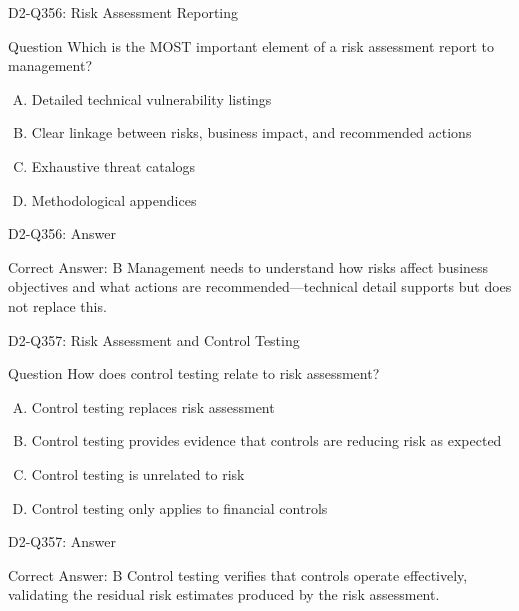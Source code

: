 \documentclass{beamer}
\begin{document}
\begin{frame}{D2-Q356: Risk Assessment Reporting}
	\begin{block}{Question}
		Which is the MOST important element of a risk assessment report to management?
	\end{block}
	\begin{enumerate}[(A)]
		\item Detailed technical vulnerability listings
		\item Clear linkage between risks, business impact, and recommended actions
		\item Exhaustive threat catalogs
		\item Methodological appendices
	\end{enumerate}
\end{frame}
\begin{frame}{D2-Q356: Answer}
	\begin{block}{Correct Answer: B}
		Management needs to understand how risks affect business objectives and what actions are recommended—technical detail supports but does not replace this.
	\end{block}
\end{frame}

\begin{frame}{D2-Q357: Risk Assessment and Control Testing}
	\begin{block}{Question}
		How does control testing relate to risk assessment?
	\end{block}
	\begin{enumerate}[(A)]
		\item Control testing replaces risk assessment
		\item Control testing provides evidence that controls are reducing risk as expected
		\item Control testing is unrelated to risk
		\item Control testing only applies to financial controls
	\end{enumerate}
\end{frame}
\begin{frame}{D2-Q357: Answer}
	\begin{block}{Correct Answer: B}
		Control testing verifies that controls operate effectively, validating the residual risk estimates produced by the risk assessment.
	\end{block}
\end{frame}
\end{document}
